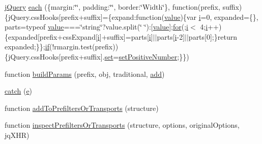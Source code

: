 \begin{DoxyCompactItemize}
\hyperlink{xe__solid__enterprise__login_2js_2login_8js_a5d40f04b6bb824963a42ec4b5fbfe262}{j\+Query} \hyperlink{jquery-1_8x_8js_a4d613a6d16c025ab901ff536b58f9ecd}{each} (\{margin\+:\char`\"{}\char`\"{}, padding\+:\char`\"{}\char`\"{}, border\+:\char`\"{}Width\char`\"{}\}, function(prefix, suffix)\{j\+Query.\+css\+Hooks\mbox{[}prefix+suffix\mbox{]}=\{expand\+:function(\hyperlink{common_2js_2jquery_8js_abe5393d870043cf6aaa1d5ad5fce755c}{value})\{var \hyperlink{jqplot_8barRenderer_8min_8js_ad34c35dd1d1578d93d112c22c7726e0f}{i}=0, expanded=\{\}, parts=typeof \hyperlink{common_2js_2jquery_8js_abe5393d870043cf6aaa1d5ad5fce755c}{value}===\char`\"{}string\char`\"{}?value.\+split(\char`\"{} \char`\"{})\+:\mbox{[}\hyperlink{common_2js_2jquery_8js_abe5393d870043cf6aaa1d5ad5fce755c}{value}\mbox{]};\hyperlink{document__category_8js_aa303d4e538a4022d72a50a7ad8ee9799}{for}(;\hyperlink{jqplot_8barRenderer_8min_8js_ad34c35dd1d1578d93d112c22c7726e0f}{i}$<$ 4;\hyperlink{jqplot_8barRenderer_8min_8js_ad34c35dd1d1578d93d112c22c7726e0f}{i}++)\{expanded\mbox{[}prefix+css\+Expand\mbox{[}\hyperlink{jqplot_8barRenderer_8min_8js_ad34c35dd1d1578d93d112c22c7726e0f}{i}\mbox{]}+suffix\mbox{]}=parts\mbox{[}\hyperlink{jqplot_8barRenderer_8min_8js_ad34c35dd1d1578d93d112c22c7726e0f}{i}\mbox{]}$\vert$$\vert$parts\mbox{[}\hyperlink{jqplot_8barRenderer_8min_8js_ad34c35dd1d1578d93d112c22c7726e0f}{i}-\/2\mbox{]}$\vert$$\vert$parts\mbox{[}0\mbox{]};\}return expanded;\}\};\hyperlink{menu_2tpl_2js_2jquery_8jstree_8js_acba95bef569cfaee32c4ed0212b2bb92}{if}(!rmargin.\+test(prefix))\{j\+Query.\+css\+Hooks\mbox{[}prefix+suffix\mbox{]}.\hyperlink{jqplot_8categoryAxisRenderer_8min_8js_affb8afe88c48c8850caeb3facf06bc3e}{set}=\hyperlink{jquery-1_8x_8js_a049182834e8b4b2d7485cd919ed272d7}{set\+Positive\+Number};\}\})
\item 
function \hyperlink{jquery-1_8x_8js_a3c4f3b337daa2444fa73ee856be5f9d8}{build\+Params} (prefix, obj, traditional, \hyperlink{common_2js_2jquery_8js_a638fd10c6d2f5e258459b1abfa3b94ea}{add})
\item 
\hyperlink{jquery-1_8x_8js_a5bf45fc51bc0426586792b5f9cb95431}{catch} (\hyperlink{jqplot_8barRenderer_8min_8js_a2ce90ea5f2a400a3a152319491a737ff}{e})
\item 
function \hyperlink{jquery-1_8x_8js_ae8bffbac8c6b2208e0ca37b475ec0b70}{add\+To\+Prefilters\+Or\+Transports} (structure)
\item 
function \hyperlink{jquery-1_8x_8js_ac96b244aea80657fe2d6e3d2c1e8b622}{inspect\+Prefilters\+Or\+Transports} (structure, options, original\+Options, jq\+X\+HR)
\item 

\end{DoxyCompactItemize}
